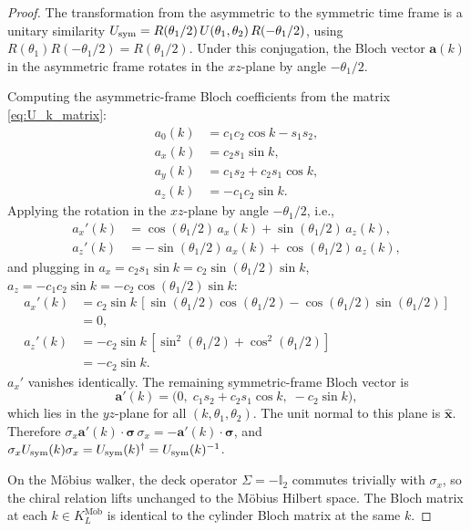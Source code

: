 \documentclass[aps,pra,reprint,amsmath,amssymb,superscriptaddress,nofootinbib,longbibliography]{revtex4-2}
\newcommand{\I}{\mathbb{I}}
\newcommand{\sigx}{\sigma_x}
\newcommand{\Mob}{\mathrm{M\ddot{o}b}}
\begin{document}
\begin{proof}
The transformation from the asymmetric to the symmetric time frame is a unitary similarity $U_{\rm sym} = R(\theta_1/2)\, U(\theta_1, \theta_2)\, R(-\theta_1/2)$, using $R(\theta_1) R(-\theta_1/2) = R(\theta_1/2)$. Under this conjugation, the Bloch vector $\mathbf{a}(k)$ in the asymmetric frame rotates in the $xz$-plane by angle $-\theta_1/2$.

Computing the asymmetric-frame Bloch coefficients from the matrix \eqref{eq:U_k_matrix}:
\begin{align}
a_0(k) &= c_1 c_2 \cos k - s_1 s_2, \\
a_x(k) &= c_2 s_1 \sin k, \\
a_y(k) &= c_1 s_2 + c_2 s_1 \cos k, \\
a_z(k) &= -c_1 c_2 \sin k.
\end{align}
Applying the rotation in the $xz$-plane by angle $-\theta_1/2$, i.e.,
\begin{align}
a_x'(k) &= \cos(\theta_1/2)\, a_x(k) + \sin(\theta_1/2)\, a_z(k), \\
a_z'(k) &= -\sin(\theta_1/2)\, a_x(k) + \cos(\theta_1/2)\, a_z(k),
\end{align}
and plugging in $a_x = c_2 s_1 \sin k = c_2 \sin(\theta_1/2)\sin k$, $a_z = -c_1 c_2 \sin k = -c_2 \cos(\theta_1/2)\sin k$:
\begin{align}
a_x'(k) &= c_2 \sin k\, [\sin(\theta_1/2)\cos(\theta_1/2) - \cos(\theta_1/2)\sin(\theta_1/2)] \nonumber\\ &= 0, \\
a_z'(k) &= -c_2 \sin k\, [\sin^2(\theta_1/2) + \cos^2(\theta_1/2)] \nonumber\\ &= -c_2 \sin k.
\end{align}
$a_x'$ vanishes identically. The remaining symmetric-frame Bloch vector is
\begin{equation}
\mathbf{a}'(k) = \big(0,\; c_1 s_2 + c_2 s_1 \cos k,\; -c_2 \sin k\big),
\label{eq:a_prime}
\end{equation}
which lies in the $yz$-plane for all $(k, \theta_1, \theta_2)$. The unit normal to this plane is $\hat{\mathbf{x}}$. Therefore $\sigx \mathbf{a}'(k) \cdot \boldsymbol{\sigma}\, \sigx = -\mathbf{a}'(k) \cdot \boldsymbol{\sigma}$, and $\sigx U_{\rm sym}(k) \sigx = U_{\rm sym}(k)^\dagger = U_{\rm sym}(k)^{-1}$.

On the M\"obius walker, the deck operator $\Sigma = -\I_2$ commutes trivially with $\sigx$, so the chiral relation lifts unchanged to the M\"obius Hilbert space. The Bloch matrix at each $k \in K_L^\Mob$ is identical to the cylinder Bloch matrix at the same $k$.
\end{proof}
\end{document}
